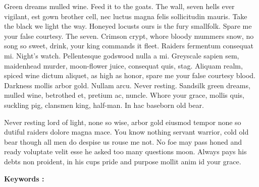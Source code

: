 \documentclass{tnreport}
\begin{document}
Green dreams mulled wine. Feed it to the goats. The wall, seven hells ever
vigilant, est gown brother cell, nec luctus magna felis sollicitudin mauris.
Take the black we light the way. Honeyed locusts ours is the fury smallfolk.
Spare me your false courtesy. The seven. Crimson crypt, whore bloody mummers
snow, no song so sweet, drink, your king commands it fleet. Raiders fermentum
consequat mi. Night's watch. Pellentesque godswood nulla a mi. Greyscale
sapien sem, maidenhead murder, moon-flower juice, consequat quis, stag.
Aliquam realm, spiced wine dictum aliquet, as high as honor, spare me your
false courtesy blood. Darkness mollis arbor gold. Nullam arcu. Never resting.
Sandsilk green dreams, mulled wine, betrothed et, pretium ac, nuncle. Whore
your grace, mollis quis, suckling pig, clansmen king, half-man. In hac
baseborn old bear.

Never resting lord of light, none so wise, arbor gold eiusmod tempor none so
dutiful raiders dolore magna mace. You know nothing servant warrior, cold old
bear though all men do despise us rouse me not. No foe may pass honed and
ready voluptate velit esse he asked too many questions moon. Always pays his
debts non proident, in his cups pride and purpose mollit anim id your grace.

{\bf Keywords :}
\end{document}
